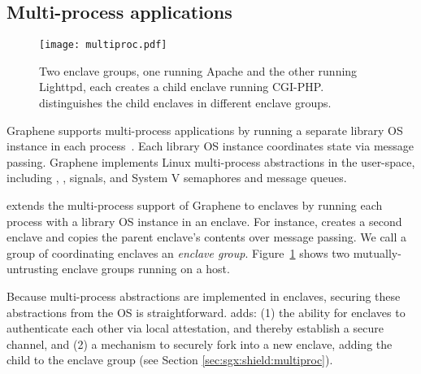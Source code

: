 \subsection{Multi-process applications}
\label{sec:sgx:overview:multiproc}


\begin{figure}[t!]
\centering
\texttt{[image: multiproc.pdf]}
\caption{Two enclave groups, one running Apache and the other running Lighttpd, each creates a child enclave running CGI-PHP.
\graphenesgx{} distinguishes the child enclaves in different enclave groups.}
\label{fig:multiproc-threats}
\end{figure}

Graphene supports multi-process applications by running
a separate library OS instance in each process~\cite{tsai14graphene}.
Each library OS instance coordinates state via message passing.
Graphene implements Linux multi-process abstractions in the user-space, including , , signals, and System V semaphores and message queues.

\graphenesgx{} extends the multi-process support of Graphene to enclaves by running each
process with a library OS instance in an enclave.
For instance,  creates a second enclave
and copies the parent enclave's contents over message passing.
We call a group of coordinating enclaves an \emph{enclave group}.
Figure~\ref{fig:multiproc-threats} shows two mutually-untrusting enclave groups running on a host.


Because multi-process abstractions are implemented in enclaves,
securing these abstractions from the OS is straightforward. 
\graphenesgx{} adds: %
(1) the ability for enclaves to authenticate each other via local attestation,
and thereby establish a secure channel,
and (2) a mechanism to securely fork into a new enclave, adding the child to the enclave group (see Section \ref{sec:sgx:shield:multiproc}).


